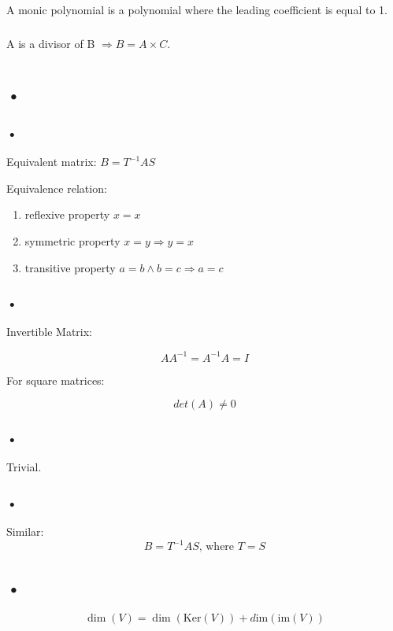 \documentclass{report}
\newcommand{\Ker}{\textrm{Ker}}
\newcommand{\im}{\textrm{im}}
\begin{document}
\section{}

\subsection{}
A monic polynomial is a polynomial where the leading coefficient is equal to 1.
\subsection{}
A is a divisor of B $\Rightarrow B=A\times C$.

\chapter{}
\section{•}
\subsection{•}
Equivalent matrix:
$B=T^{-1}AS$

Equivalence relation:
\begin{enumerate}
\item reflexive property $x=x$
\item symmetric property $x=y \Rightarrow y=x$
\item transitive property $a=b \land b=c \Rightarrow a=c$
\end{enumerate}
\subsection{•}
Invertible Matrix:

$$AA^{-1}=A^{-1}A=I$$

For square matrices:

$$det(A) \neq 0$$
\subsection{•}
Trivial.
\subsection{•}
Similar:
$$B=T^{-1}AS\textrm{, where }T=S$$

\section{•}
$$\dim(V)=\dim(\Ker(V))+d\im(\im(V))$$
\end{document}
